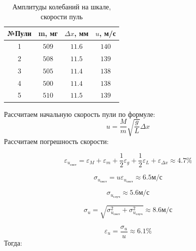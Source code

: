 \documentclass[a4paper]{article}
\begin{document}
\begin{table}[!h]
\centering
\caption{Амплитуды колебаний на шкале, скорости пуль}
\begin{tabular}{|c|c|c|c|}        \hline
    №Пули & m, мг & $\Delta x$, мм & $u$, м/с \\  \hline
    1 & $509$ & $11.6$ & $140$\\ \hline
    2 & $508$ & $11.5$ & $139$\\ \hline
    3 & $505$ & $11.4$ & $138$\\ \hline
    4 & $500$ & $11.4$ & $138$\\ \hline
    5 & $510$ & $11.5$ & $139$\\ \hline
\end{tabular}
\end{table}
\newpage

\noindent Рассчитаем начальную скорость пули по формуле:
\[u = \frac{M}{m} \sqrt{\frac{g}{L}} \Delta x\]
Рассчитаем погрешность скорости:

\[\varepsilon_{u_{\text{снст}}} = \varepsilon_M + \varepsilon_m + \frac{1}{2} \varepsilon_g + \frac{1}{2} \varepsilon_L + \varepsilon_{\Delta x} \approx 4.7\%\]

\[\sigma_{u_{\text{снст}}} = u \varepsilon_{u_{\text{снст}}} \approx 6.5 \text{м/с}\]

\[\sigma_{u_{\text{случ}}} \approx 5.6 \text{м/с}\]

\[\sigma_u = \sqrt{\sigma_{u_{\text{снст}}}^2 + \sigma_{u_{\text{случ}}}^2} \approx 8.6 \text{м/с} \]

\[\varepsilon_u = \frac{\sigma_u}{u} \approx 6.1\%\]
Тогда:
\end{document}
